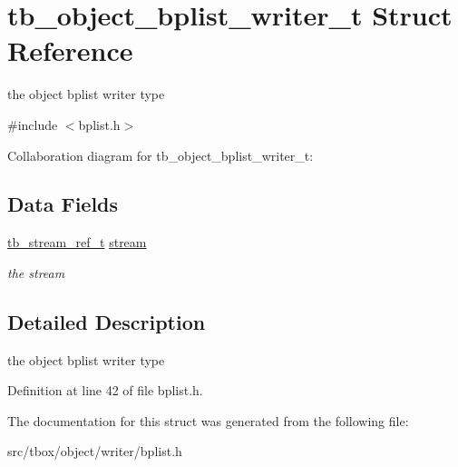 \hypertarget{structtb__object__bplist__writer__t}{\section{tb\-\_\-object\-\_\-bplist\-\_\-writer\-\_\-t Struct Reference}
\label{structtb__object__bplist__writer__t}
}


the object bplist writer type  




{\ttfamily \#include $<$bplist.\-h$>$}



Collaboration diagram for tb\-\_\-object\-\_\-bplist\-\_\-writer\-\_\-t\-:
\subsection*{Data Fields}
\begin{DoxyCompactItemize}
\item 
\hypertarget{structtb__object__bplist__writer__t_a682cafd2c7c8c109496fabf83b2df4f1}{\hyperlink{structtb__stream__ref__t}{tb\-\_\-stream\-\_\-ref\-\_\-t} \hyperlink{structtb__object__bplist__writer__t_a682cafd2c7c8c109496fabf83b2df4f1}{stream}}\label{structtb__object__bplist__writer__t_a682cafd2c7c8c109496fabf83b2df4f1}

\begin{DoxyCompactList}\small\item\em the stream \end{DoxyCompactList}\end{DoxyCompactItemize}


\subsection{Detailed Description}
the object bplist writer type 

Definition at line 42 of file bplist.\-h.



The documentation for this struct was generated from the following file\-:\begin{DoxyCompactItemize}
\item 
src/tbox/object/writer/bplist.\-h\end{DoxyCompactItemize}
